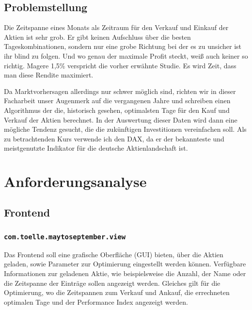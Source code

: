 \documentclass[12pt, a4paper, titlepage]{report}
\begin{document}
        \section{Problemstellung}
            Die Zeitspanne eines Monats als Zeitraum für den Verkauf und Einkauf
            der Aktien ist sehr grob. Er gibt keinen Aufschluss über die besten
            Tageskombinationen, sondern nur eine grobe Richtung bei der es zu
            unsicher ist ihr blind zu folgen. Und wo genau der maximale Profit
            steckt, weiß auch keiner so richtig. Magere 1,5\% verspricht die
            vorher erwähnte Studie. Es wird Zeit, dass man diese Rendite maximiert.
            
            Da Marktvorhersagen allerdings nur schwer möglich sind, richten wir
            in dieser Facharbeit unser Augenmerk auf die vergangenen Jahre und 
            schreiben einen Algorithmus der die, historisch gesehen, optimalsten Tage
            für den Kauf und Verkauf der Aktien berechnet. In der Auswertung dieser
            Daten wird dann eine mögliche Tendenz gesucht, die die zukünftigen
            Investitionen vereinfachen soll.
            Als zu betrachtenden Kurs verwende ich den DAX, da er der bekannteste und
            meistgenutzte Indikator für die deutsche Aktienlandschaft ist.

    \chapter{Anforderungsanalyse}
        \section{Frontend}
        	\subsection{\texttt{com.toelle.maytoseptember.view}}
        		Das Frontend soll eine grafische Oberfläche (GUI) bieten, über die
        		Aktien geladen, sowie Parameter zur Optimierung eingestellt werden 
        		können. Verfügbare Informationen zur geladenen Aktie, wie beispielsweise
        		die Anzahl, der Name oder die Zeitspanne der Einträge sollen angezeigt
        		werden. Gleiches gilt für die Optimierung, wo die Zeitspannen zum 
                Verkauf und Ankauf, die errechneten optimalen Tage und der Performance
                Index angezeigt werden.
        		
\end{document}
